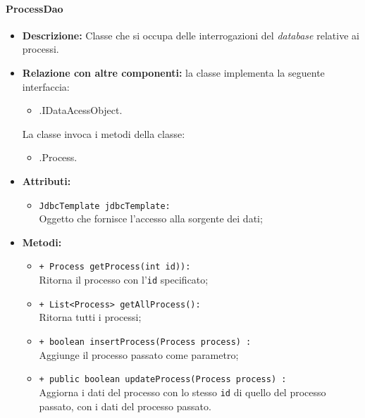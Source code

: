 \paragraph{ProcessDao}
\label{processdao}
\begin{flushleft}
\begin{itemize}
\item \textbf{Descrizione:} Classe che si occupa delle interrogazioni del \textit{database} relative ai processi.
\item \textbf{Relazione con altre componenti:} la classe implementa la seguente interfaccia:
		\begin{itemize}
			\item \smodel{}.IDataAcessObject.
		\end{itemize}
		La classe invoca i metodi della classe:
		\begin{itemize}
			\item \smodel{}.Process.
		\end{itemize}
\item \textbf{Attributi:}
\begin{sloppypar}
\begin{itemize}
\item \texttt{JdbcTemplate jdbcTemplate:}\\ Oggetto che fornisce l'accesso alla sorgente dei dati;
\end{itemize}
\end{sloppypar}
\item \textbf{Metodi:}
\begin{sloppypar}
\begin{itemize}
\item \texttt{+ Process getProcess(int id)):}\\ Ritorna il processo con l'\texttt{id} specificato; 
\item \texttt{+ List<Process> getAllProcess():}\\ Ritorna tutti i processi;
\item \texttt{+ boolean insertProcess(Process process) :}\\ Aggiunge il processo passato come parametro;
\item \texttt{+ public boolean updateProcess(Process process) :}\\ Aggiorna i dati del processo con lo stesso \texttt{id} di quello del processo passato, con i dati del processo passato.
\end{itemize}
\end{sloppypar}
\end{itemize}
\end{flushleft}

